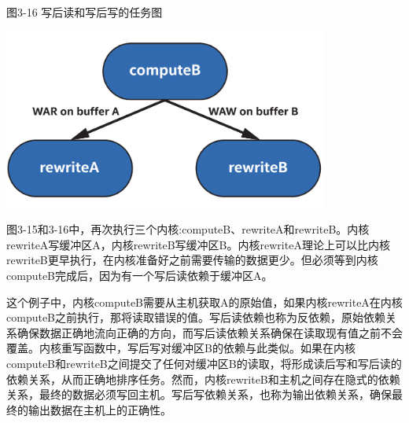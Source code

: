 \hspace*{\fill} \par %
图3-16 写后读和写后写的任务图
\begin{center}
	\includegraphics[width=0.8\textwidth]{content/chapter-3/images/9}
\end{center}

图3-15和3-16中，再次执行三个内核:computeB、rewriteA和rewriteB。内核rewriteA写缓冲区A，内核rewriteB写缓冲区B。内核rewriteA理论上可以比内核rewriteB更早执行，在内核准备好之前需要传输的数据更少。但必须等到内核computeB完成后，因为有一个写后读依赖于缓冲区A。\par

这个例子中，内核computeB需要从主机获取A的原始值，如果内核rewriteA在内核computeB之前执行，那将读取错误的值。写后读依赖也称为反依赖，原始依赖关系确保数据正确地流向正确的方向，而写后读依赖关系确保在读取现有值之前不会覆盖。内核重写函数中，写后写对缓冲区B的依赖与此类似。如果在内核computeB和rewriteB之间提交了任何对缓冲区B的读取，将形成读后写和写后读的依赖关系，从而正确地排序任务。然而，内核rewriteB和主机之间存在隐式的依赖关系，最终的数据必须写回主机。写后写依赖关系，也称为输出依赖关系，确保最终的输出数据在主机上的正确性。\par





















